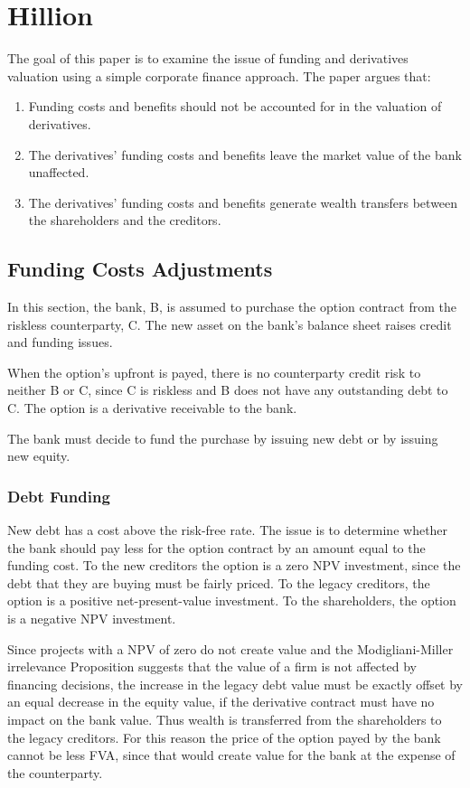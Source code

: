 \documentclass[10pt,a4paper]{article}
\begin{document}
    \section{Hillion}
        The goal of this paper is to examine the issue of funding and derivatives valuation using a simple corporate finance approach. The paper argues that:
            \begin{enumerate}
                \item Funding costs and benefits should not be accounted for in the valuation of derivatives.
                \item The derivatives' funding costs and benefits leave the market value of the bank unaffected.
                \item The derivatives' funding costs and benefits generate wealth transfers between the shareholders and the creditors.
            \end{enumerate}

        \subsection{Funding Costs Adjustments}
            In this section, the bank, B, is assumed to purchase the option contract from the riskless counterparty, C. The new asset on the bank's balance sheet raises credit and funding issues.

            When the option's upfront is payed, there is no counterparty credit risk to neither B or C, since C is riskless and B does not have any outstanding debt to C. The option is a derivative receivable to the bank.

            The bank must decide to fund the purchase by issuing new debt or by issuing new equity.

            \subsubsection{Debt Funding}
                New debt has a cost above the risk-free rate. The issue is to determine whether the bank should pay less for the option contract by an amount equal to the funding cost. To the new creditors the option is a zero NPV investment, since the debt that they are buying must be fairly priced. To the legacy creditors, the option is a positive net-present-value investment. To the shareholders, the option is a negative NPV investment.

                Since projects with a NPV of zero do not create value and the Modigliani-Miller irrelevance Proposition suggests that the value of a firm is not affected by financing decisions, the increase in the legacy debt value must be exactly offset by an equal decrease in the equity value, if the derivative contract must have no impact on the bank value. Thus wealth is transferred from the shareholders to the legacy creditors. For this reason the price of the option payed by the bank cannot be less FVA, since that would create value for the bank at the expense of the counterparty.
\end{document}

